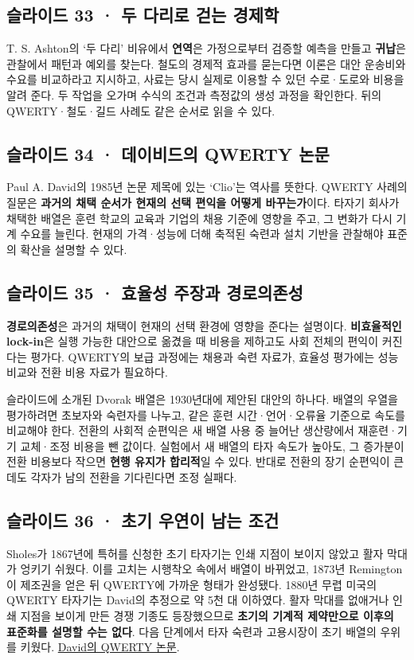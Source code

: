 \documentclass[10pt,a4paper]{article}
\begin{document}
\subsection{슬라이드 33 · 두 다리로 걷는 경제학}
T. S. Ashton의 ‘두 다리’ 비유에서 \textbf{연역}은 가정으로부터 검증할 예측을 만들고 \textbf{귀납}은 관찰에서 패턴과 예외를 찾는다. 철도의 경제적 효과를 묻는다면 이론은 대안 운송비와 수요를 비교하라고 지시하고, 사료는 당시 실제로 이용할 수 있던 수로·도로와 비용을 알려 준다. 두 작업을 오가며 수식의 조건과 측정값의 생성 과정을 확인한다. 뒤의 QWERTY·철도·길드 사례도 같은 순서로 읽을 수 있다.\par

\subsection{슬라이드 34 · 데이비드의 QWERTY 논문}
Paul A. David의 1985년 논문 제목에 있는 ‘Clio’는 역사를 뜻한다. QWERTY 사례의 질문은 \textbf{과거의 채택 순서가 현재의 선택 편익을 어떻게 바꾸는가}이다. 타자기 회사가 채택한 배열은 훈련 학교의 교육과 기업의 채용 기준에 영향을 주고, 그 변화가 다시 기계 수요를 늘린다. 현재의 가격·성능에 더해 축적된 숙련과 설치 기반을 관찰해야 표준의 확산을 설명할 수 있다.\par

\subsection{슬라이드 35 · 효율성 주장과 경로의존성}
\textbf{경로의존성}은 과거의 채택이 현재의 선택 환경에 영향을 준다는 설명이다. \textbf{비효율적인 lock-in}은 실행 가능한 대안으로 옮겼을 때 비용을 제하고도 사회 전체의 편익이 커진다는 평가다. QWERTY의 보급 과정에는 채용과 숙련 자료가, 효율성 평가에는 성능 비교와 전환 비용 자료가 필요하다.\par

슬라이드에 소개된 Dvorak 배열은 1930년대에 제안된 대안의 하나다. 배열의 우열을 평가하려면 초보자와 숙련자를 나누고, 같은 훈련 시간·언어·오류율 기준으로 속도를 비교해야 한다. 전환의 사회적 순편익은 새 배열 사용 중 늘어난 생산량에서 재훈련·기기 교체·조정 비용을 뺀 값이다. 실험에서 새 배열의 타자 속도가 높아도, 그 증가분이 전환 비용보다 작으면 \textbf{현행 유지가 합리적}일 수 있다. 반대로 전환의 장기 순편익이 큰데도 각자가 남의 전환을 기다린다면 조정 실패다.\par

\subsection{슬라이드 36 · 초기 우연이 남는 조건}
Sholes가 1867년에 특허를 신청한 초기 타자기는 인쇄 지점이 보이지 않았고 활자 막대가 엉키기 쉬웠다. 이를 고치는 시행착오 속에서 배열이 바뀌었고, 1873년 Remington이 제조권을 얻은 뒤 QWERTY에 가까운 형태가 완성됐다. 1880년 무렵 미국의 QWERTY 타자기는 David의 추정으로 약 5천 대 이하였다. 활자 막대를 없애거나 인쇄 지점을 보이게 만든 경쟁 기종도 등장했으므로 \textbf{초기의 기계적 제약만으로 이후의 표준화를 설명할 수는 없다}. 다음 단계에서 타자 숙련과 고용시장이 초기 배열의 우위를 키웠다. \href{https://www.jstor.org/stable/1805621}{David의 QWERTY 논문}.\par
\end{document}
